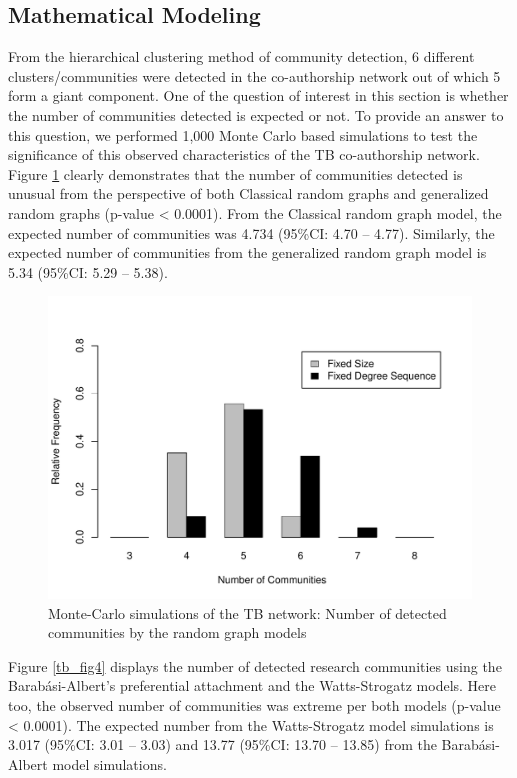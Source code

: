 \subsection{Mathematical Modeling}
From the hierarchical clustering method of community detection, 6 different clusters/communities were detected in the co-authorship network out of which 5 form a giant component. One of the question of interest in this section is whether the number of communities detected is expected or not. To provide an answer to this question, we performed 1,000 Monte Carlo based simulations to test the significance of this observed characteristics of the TB co-authorship network. Figure \ref{tb_fig3} clearly demonstrates that the number of communities detected is unusual from the perspective of both Classical random graphs and generalized random graphs (p-value < 0.0001). From the Classical random graph model, the expected number of communities was 4.734 (95\%CI: 4.70 -- 4.77). Similarly, the expected number of communities from the generalized random graph model is 5.34 (95\%CI: 5.29 -- 5.38).

\begin{figure}[h!]
\centering
\includegraphics[scale=0.65]{Chapters/tb/randomComm}
\caption{Monte-Carlo simulations of the TB network: Number of detected communities by the random graph models}
\label{tb_fig3}
\end{figure}

Figure \ref{tb_fig4} displays the number of detected research communities using the Barab\'asi-Albert's preferential attachment and the Watts-Strogatz models. Here too, the observed number of communities was extreme per both models (p-value < 0.0001). The expected number from the Watts-Strogatz model simulations is 3.017 (95\%CI: 3.01 -- 3.03) and 13.77 (95\%CI: 13.70 -- 13.85) from the Barab\'asi-Albert model simulations. 

